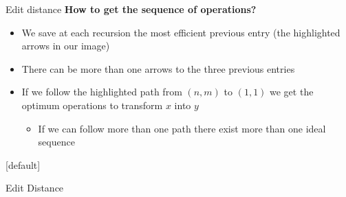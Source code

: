 \begin{frame}{Edit distance}
  \textbf{How to get the sequence of operations?}
  \begin{itemize}
    \item
      We save at each recursion the most efficient previous entry
      (the {\color{Mittel-Blau}highlighted arrows} in our image)
    \item
      There can be {\color{Mittel-Blau}more than one} arrows to the three
      previous entries
    \item
      If we follow the highlighted path from {\color{Mittel-Blau}$(n, m)$} to
      {\color{Mittel-Blau}$(1, 1)$} we get the optimum operations to transform
      {\color{Mittel-Blau}$x$} into {\color{Mittel-Blau}$y$}
      \begin{itemize}
        \item
          If we can follow {\color{Mittel-Blau}more than one path} there exist
          more than one ideal {\color{Mittel-Blau}sequence}
      \end{itemize}
  \end{itemize}
\end{frame}


{%
  [default]
  \makeatletter\def\beamer@entrycode{\vspace*{-\headheight}}\makeatother
  \begin{frame}{Edit Distance}
    \begin{center}
      \begin{adjustbox}{width=0.8\linewidth}
        \def\AlgoIntro{0}\def\AlgoFinal{1}%
        
      \end{adjustbox}
    \end{center}
  \end{frame}
}%


